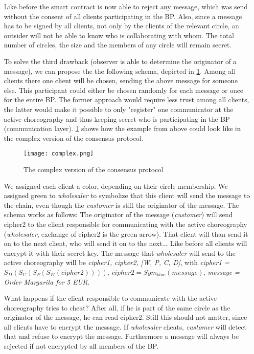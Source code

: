 \documentclass[runningheads]{llncs}
\begin{document}
Like before the smart contract is now able to reject any message, which was send without the consent of all clients participating in the BP. Also, since a message has to be signed by all clients, not only by the clients of the relevant circle, an outsider will not be able to know who is collaborating with whom. The total number of circles, the size and the members of any circle will remain secret. 

To solve the third drawback (observer is able to determine the originator of a message), we can propose the the following schema, depicted in \ref{fig:complex}. Among all clients there one client will be chosen, sending the above message for someone else. This participant could either be chosen randomly for each message or once for the entire BP. The former approach would require less trust among all clients, the latter would make it possible to only "register" one communicator at the active choreography and thus keeping secret who is participating in the BP (communication layer). \ref{fig:complex} shows how the example from above could look like in the complex version of the consensus protocol.

\begin{figure}
    \centering
    \texttt{[image: complex.png]}
    \caption{The complex version of the consensus protocol}
    \label{fig:complex}
\end{figure}


We assigned each client a color, depending on their circle membership. We assigned green to \textit{wholesaler} to symbolize that this client will send the message to the chain, even though the \textit{customer} is still the originator of the message. The schema works as follows: The originator of the message (\textit{customer}) will send cipher2 to the client responsible for communicating with the active choreography (\textit{wholesaler}, exchange of cipher2 is the green arrow). That client will than send it on to the next client, who will send it on to the next... Like before all clients will encrypt it with their secret key. The message that \textit{wholesaler} will send to the active choreography will be \textit{cipher1, cipher2, [W, P, C, D]}, with \textit{cipher1 =} $S_D(S_C(S_P(S_W(cipher2))))$, $cipher2 = Sym_{blue}(message)$, \textit{message = Order Margarita for 5 EUR}. 

What happens if the client responsible to communicate with the active choreography tries to cheat? After all, if he is part of the same circle as the originator of the message, he can read cipher2. Still this should not matter, since all clients have to encrypt the message. If \textit{wholesaler} cheats, \textit{customer} will detect that and refuse to encrypt the message. Furthermore a message will always be rejected if not encrypted by all members of the BP.
\end{document}
